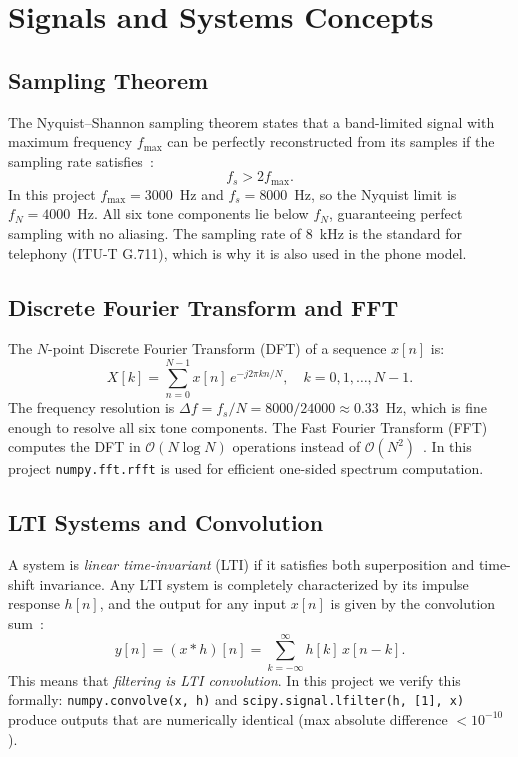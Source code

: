 \documentclass[journal]{IEEEtran}
\begin{document}
\section{Signals and Systems Concepts}
\label{sec:theory}

\subsection{Sampling Theorem}

The Nyquist--Shannon sampling theorem states that a band-limited signal with
maximum frequency $f_{\max}$ can be perfectly reconstructed from its samples if
the sampling rate satisfies~\cite{oppenheim2010}:
\begin{equation}
  f_s > 2 f_{\max}.
  \label{eq:nyquist}
\end{equation}
In this project $f_{\max} = 3000$~Hz and $f_s = 8000$~Hz, so the Nyquist limit
is $f_N = 4000$~Hz. All six tone components lie below $f_N$, guaranteeing
perfect sampling with no aliasing. The sampling rate of 8~kHz is the standard
for telephony (ITU-T G.711), which is why it is also used in the phone model.

\subsection{Discrete Fourier Transform and FFT}

The $N$-point Discrete Fourier Transform (DFT) of a sequence $x[n]$ is:
\begin{equation}
  X[k] = \sum_{n=0}^{N-1} x[n]\,e^{-j2\pi kn/N}, \quad k = 0,1,\ldots,N-1.
  \label{eq:dft}
\end{equation}
The frequency resolution is $\Delta f = f_s / N = 8000/24000 \approx 0.33$~Hz,
which is fine enough to resolve all six tone components. The Fast Fourier
Transform (FFT) computes the DFT in $\mathcal{O}(N\log N)$ operations instead
of $\mathcal{O}(N^2)$~\cite{proakis2007}. In this project \texttt{numpy.fft.rfft}
is used for efficient one-sided spectrum computation.

\subsection{LTI Systems and Convolution}

A system is \textit{linear time-invariant} (LTI) if it satisfies both
superposition and time-shift invariance. Any LTI system is completely
characterized by its impulse response $h[n]$, and the output for any input
$x[n]$ is given by the convolution sum~\cite{oppenheim2010}:
\begin{equation}
  y[n] = (x * h)[n] = \sum_{k=-\infty}^{\infty} h[k]\,x[n-k].
  \label{eq:conv}
\end{equation}
This means that \emph{filtering is LTI convolution}. In this project we verify
this formally: \texttt{numpy.convolve(x,~h)} and \texttt{scipy.signal.lfilter(h,~[1],~x)}
produce outputs that are numerically identical (max absolute difference $< 10^{-10}$).
\end{document}
